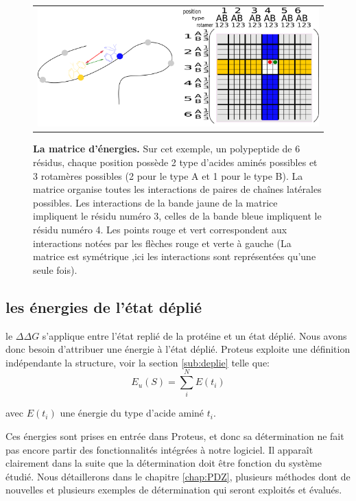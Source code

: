    \begin{figure}[!htbp]
     \centering
     \begin{tabular}{c}
       \includegraphics[width=15cm]{figure/matrice.png}
       \label{Graph:mat_ener}
     \end{tabular}
     
     \caption{\textbf{La matrice d'énergies.} Sur cet exemple, un polypeptide de 6 résidus, chaque position possède 2 type d'acides aminés possibles et 3 rotamères possibles (2 pour le type A et 1 pour le type B). La matrice organise toutes les interactions de paires de chaînes latérales possibles. Les interactions de la bande jaune de la matrice impliquent le résidu numéro 3, celles de la bande bleue impliquent le résidu numéro 4. Les points rouge et vert correspondent aux interactions notées par les flèches rouge et verte à gauche (La matrice est symétrique ,ici les interactions sont représentées qu'une seule fois).}
\label{fig:matener}
   \end{figure}
   

\subsection{les énergies de l'état déplié}

le $\Delta \Delta G$ s'applique entre l'état replié de la protéine et un état déplié. Nous avons donc besoin d'attribuer une énergie à l'état déplié. Proteus exploite une définition indépendante la structure, voir la section \ref{sub:deplie} telle que:
\begin{equation}
E_u(S) = \sum_i^N E(t_i)  
\end{equation}

avec $E(t_i)$ une énergie du type d'acide aminé $t_i$.

Ces énergies sont prises en entrée dans Proteus, et donc sa détermination ne fait pas encore partir des fonctionnalités intégrées à notre logiciel. Il apparaît clairement dans la suite que la détermination doit être fonction du système étudié. Nous détaillerons dans le chapitre \ref{chap:PDZ}, plusieurs méthodes dont de nouvelles et plusieurs exemples de détermination qui seront exploités et évalués.


